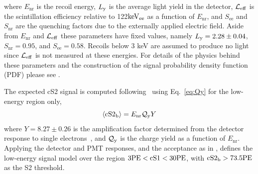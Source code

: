 %
%
%

where $E_\mathrm{nr}$ is the recoil energy, $L_{\mathrm{y}}$ is the average light yield in the detector, $\mathcal{L}_{\mathrm{eff}}$ is the scintillation efficiency relative to 122$\mathrm{keV_\mathrm{ee}}$ as a function of $E_\mathrm{nr}$, and $S_\mathrm{ee}$ and $S_\mathrm{nr}$ are the quenching factors due to the externally applied electric field. Aside from $E_\mathrm{nr}$ and $\mathcal{L}_{\mathrm{eff}}$ these parameters have fixed values, namely $L_{\mathrm{y}} = 2.28 \pm 0.04$, $S_\mathrm{nr} = 0.95$, and $S_\mathrm{ee} = 0.58$. Recoils below 3 keV are assumed to produce no light since $\mathcal{L}_{\mathrm{eff}}$ is not measured at these energies. For details of the physics behind these parameters and the construction of the signal probability density function (PDF) please see \cite{Aprile:2012vw,xe100_run_combination}. 

The expected cS2 signal is computed following~\cite{DataMCXenon} using Eq.~\ref{eq:Qy} for the low-energy region only,
%
\begin{equation}
\label{eq:Qy}
	\langle \mathrm{cS2}_\mathrm{b} \rangle = E_{\mathrm{nr}}\mathcal{Q}_{\mathrm{y}} Y   
\end{equation}
%
where $Y = 8.27 \pm 0.26$ 
is the amplification factor determined from the detector response to single electrons~\cite{XenonSingleElectron}, and $\mathcal{Q}_{\mathrm{y}}$ is the charge yield as a function of $E_\mathrm{nr}$. Applying the detector and PMT responses, and the acceptance as in \cite{xe100_run_combination}, defines the low-energy signal model over the region $3 \mathrm{PE} < \mathrm{cS1} < 30 \mathrm{PE}$, with $\mathrm{cS2}_\mathrm{b} > 73.5 \mathrm{PE}$ as the S2 threshold.

